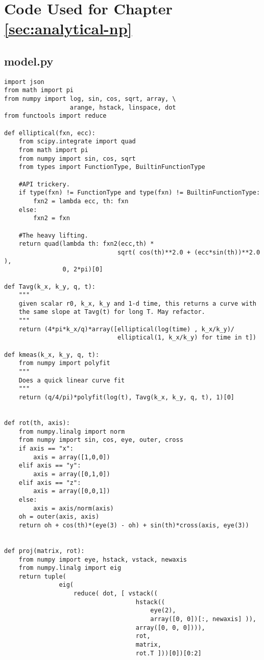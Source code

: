 \chapter{Code Used for Chapter \ref{sec:analytical-np}}
\label{apx:analytical-np}

\section{model.py}

\small
\begin{verbatim}
import json
from math import pi
from numpy import log, sin, cos, sqrt, array, \
                  arange, hstack, linspace, dot
from functools import reduce

def elliptical(fxn, ecc):
    from scipy.integrate import quad
    from math import pi
    from numpy import sin, cos, sqrt
    from types import FunctionType, BuiltinFunctionType

    #API trickery.
    if type(fxn) != FunctionType and type(fxn) != BuiltinFunctionType:
        fxn2 = lambda ecc, th: fxn
    else:
        fxn2 = fxn

    #The heavy lifting.
    return quad(lambda th: fxn2(ecc,th) *
                               sqrt( cos(th)**2.0 + (ecc*sin(th))**2.0 ),
                0, 2*pi)[0]

def Tavg(k_x, k_y, q, t):
    """
    given scalar r0, k_x, k_y and 1-d time, this returns a curve with
    the same slope at Tavg(t) for long T. May refactor.
    """
    return (4*pi*k_x/q)*array([elliptical(log(time) , k_x/k_y)/
                               elliptical(1, k_x/k_y) for time in t])

def kmeas(k_x, k_y, q, t):
    from numpy import polyfit
    """
    Does a quick linear curve fit 
    """
    return (q/4/pi)*polyfit(log(t), Tavg(k_x, k_y, q, t), 1)[0]


def rot(th, axis):
    from numpy.linalg import norm
    from numpy import sin, cos, eye, outer, cross
    if axis == "x":
        axis = array([1,0,0])
    elif axis == "y":
        axis = array([0,1,0])
    elif axis == "z":
        axis = array([0,0,1])
    else:
        axis = axis/norm(axis)
    oh = outer(axis, axis)
    return oh + cos(th)*(eye(3) - oh) + sin(th)*cross(axis, eye(3))
    

def proj(matrix, rot):
    from numpy import eye, hstack, vstack, newaxis
    from numpy.linalg import eig
    return tuple(
               eig(
                   reduce( dot, [ vstack((
                                    hstack((
                                        eye(2),
                                        array([0, 0])[:, newaxis] )),
                                    array([0, 0, 0]))),
                                    rot,
                                    matrix,
                                    rot.T ]))[0])[0:2]



\end{verbatim}
